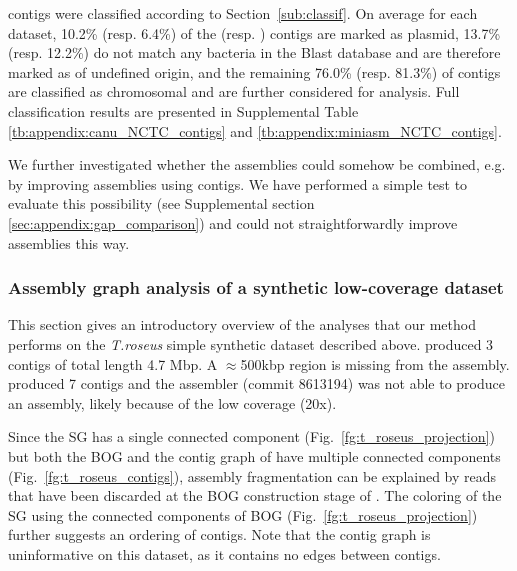 \documentclass[./main.tex]{subfiles}
\newcommand{\modafterreview}[1]{#1}
\begin{document}
\canu contigs were classified according to Section~\ref{sub:classif}. On average for each dataset, 10.2\% (resp. 6.4\%) of the \canu (resp. \miniasm) contigs are marked as plasmid, 13.7\% (resp. 12.2\%) do not match any bacteria in the Blast database and are therefore marked as of undefined origin, and the remaining 76.0\% (resp. 81.3\%) of contigs are classified as chromosomal and are further considered for analysis. Full classification results are presented in Supplemental Table \ref{tb:appendix:canu_NCTC_contigs} and \ref{tb:appendix:miniasm_NCTC_contigs}.

\modafterreview{We further investigated whether the assemblies %
   could somehow be combined, e.g. by improving \canu assemblies using \miniasm contigs. We have performed a simple test to evaluate this possibility (see Supplemental section \ref{sec:appendix:gap_comparison}) and could not straightforwardly improve assemblies this way.}

\subsubsection{Assembly graph analysis of a synthetic low-coverage dataset}

This section gives an introductory overview of the analyses that our method performs on the \textsl{T.roseus} simple synthetic dataset described above.
\canu produced 3 contigs of total length 4.7 Mbp. A $\approx$500kbp region is missing from the assembly. 
\miniasm produced 7 contigs and the \hinge assembler (commit 8613194) was not able to produce an assembly, likely because of the low coverage (20x).
%

Since the SG has a single connected component
(Fig.~\ref{fg:t_roseus_projection}) but both the BOG and the contig graph of \canu have multiple connected components (Fig.~\ref{fg:t_roseus_contigs}), assembly fragmentation can be explained by reads that have been discarded at the BOG construction stage of \canu.
%
The coloring of the SG using the connected components of \canu BOG (Fig.~\ref{fg:t_roseus_projection}) further suggests an ordering of contigs. Note that the \canu contig graph is uninformative on this dataset, as it contains no edges between contigs. 
\end{document}
